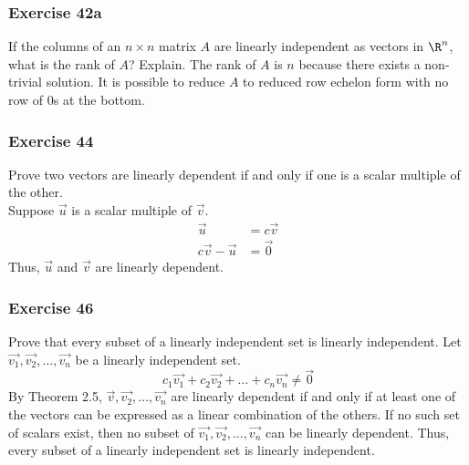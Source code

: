 \documentclass{math}
\begin{document}
\subsubsection*{Exercise 42a}
If the columns of an \( n\times n \) matrix \( A \) are linearly independent
as vectors in \( \R^n \), what is the rank of \( A \)? Explain.
The rank of \( A \) is \( n \) because there exists a non-trivial solution. It
is possible to reduce \( A \) to reduced row echelon form with no row of 0s
at the bottom.

\subsubsection*{Exercise 44}
Prove two vectors are linearly dependent if and only if one is a scalar multiple
of the other. \\
Suppose \( \vec{u} \) is a scalar multiple of \( \vec{v} \).
\begin{align*}
  \vec{u} &= c\vec{v} \\
  c\vec{v}-\vec{u} &= \vec{0}
\end{align*}
Thus, \( \vec{u} \) and \( \vec{v} \) are linearly dependent.

\subsubsection*{Exercise 46}
Prove that every subset of a linearly independent set is linearly independent.
Let \( \vec{v_1},\vec{v_2},\dots,\vec{v_n} \) be a linearly independent set.
\[ c_1\vec{v_1}+c_2\vec{v_2}+\dots+c_n\vec{v_n} \ne \vec{0} \]
By Theorem 2.5, \( \vec{v},\vec{v_2},\dots,\vec{v_n} \) are linearly dependent
if and only if at least one of the vectors can be expressed as a linear
combination of the others. If no such set of scalars exist, then no subset
of \( \vec{v_1},\vec{v_2},\dots,\vec{v_n} \) can be linearly dependent. Thus,
every subset of a linearly independent set is linearly independent.
\end{document}
